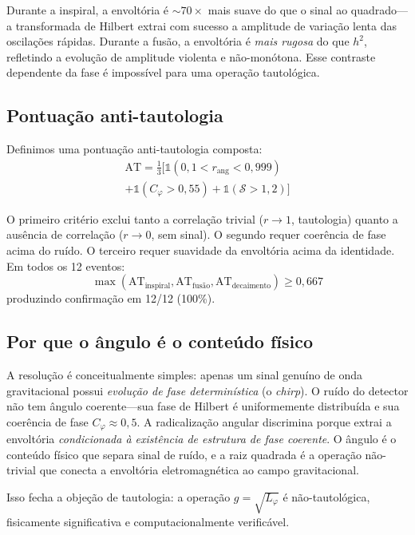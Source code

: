 \documentclass[12pt,a4paper,twocolumn]{article}
\begin{document}
Durante a inspiral, a envoltória é $\sim 70\times$ mais suave do que o sinal ao quadrado---a transformada de Hilbert extrai com sucesso a amplitude de variação lenta das oscilações rápidas. Durante a fusão, a envoltória é \emph{mais rugosa} do que $h^2$, refletindo a evolução de amplitude violenta e não-monótona. Esse contraste dependente da fase é impossível para uma operação tautológica.

\subsection{Pontuação anti-tautologia}

Definimos uma pontuação anti-tautologia composta:
\begin{multline}
\text{AT} = \tfrac{1}{3}\bigl[\mathbb{1}(0{,}1 < r_{\text{ang}} < 0{,}999) \\
+ \mathbb{1}(C_\varphi > 0{,}55) + \mathbb{1}(\mathcal{S} > 1{,}2)\bigr]
\end{multline}

O primeiro critério exclui tanto a correlação trivial ($r \to 1$, tautologia) quanto a ausência de correlação ($r \to 0$, sem sinal). O segundo requer coerência de fase acima do ruído. O terceiro requer suavidade da envoltória acima da identidade. Em todos os 12 eventos:
\begin{equation}
\max(\text{AT}_{\text{inspiral}}, \text{AT}_{\text{fusão}}, \text{AT}_{\text{decaimento}}) \geq 0{,}667
\end{equation}
produzindo confirmação em 12/12 (100\%).

\subsection{Por que o ângulo é o conteúdo físico}

A resolução é conceitualmente simples: apenas um sinal genuíno de onda gravitacional possui \emph{evolução de fase determinística} (o \textit{chirp}). O ruído do detector não tem ângulo coerente---sua fase de Hilbert é uniformemente distribuída e sua coerência de fase $C_\varphi \approx 0{,}5$. A radicalização angular discrimina porque extrai a envoltória \emph{condicionada à existência de estrutura de fase coerente}. O ângulo é o conteúdo físico que separa sinal de ruído, e a raiz quadrada é a operação não-trivial que conecta a envoltória eletromagnética ao campo gravitacional.

Isso fecha a objeção de tautologia: a operação $g = \sqrt{L_\varphi}$ é não-tautológica, fisicamente significativa e computacionalmente verificável.
\end{document}
